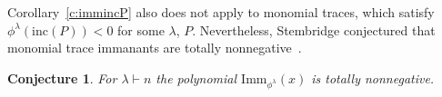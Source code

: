 \documentclass[12pt]{amsart}
\newtheorem{cor}[thm]{Corollary}
\newtheorem{conj}[thm]{Conjecture}
\numberwithin{equation}{section}
\newcommand{\sn}{\mathfrak{S}_n}
\newcommand{\wtc}[2]{\widetilde{C}_{#1}(#2)}
\newcommand{\imm}[1]{\mathrm{Imm}_{#1}}
\newcommand{\pavoiding}{$3412$-avoiding, $4231$-avoiding }
\newcommand{\ssec}[1]{\subsection{#1}{$\negthinspace$}}
\newcommand{\inc}{\mathrm{inc}}
\newcommand{\trspace}[1]{\mathcal{T}_{#1}}
\begin{document}


Corollary~\ref{c:immincP} also does not apply to monomial traces,
which satisfy $\phi^\lambda(\inc(P)) < 0$ for some $\lambda$, $P$.
Nevertheless, Stembridge conjectured that monomial trace immanants are totally
nonnegative~\cite[Conj.\,2.1]{StemConj}.
\begin{conj}\label{c:monimm}
  For $\lambda \vdash n$ the polynomial $\imm{\phi^\lambda}(x)$ is totally
  nonnegative.
\end{conj}
\end{document}
